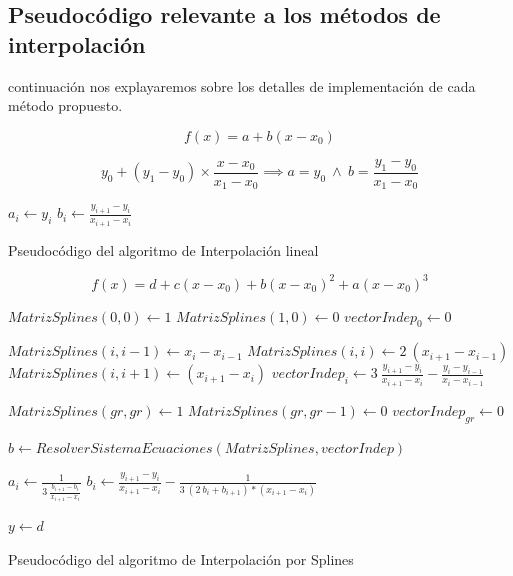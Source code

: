 
\subsection{Pseudocódigo relevante a los métodos de interpolación}
\par {} continuaci\'on nos explayaremos sobre los detalles de
implementaci\'on de cada m\'etodo propuesto.

\vspace{0.4cm}

$$f(x) = a + b (x - x_0)$$

$$y_0 + (y_1-y_0) \times \frac{x - x_0}{x_1 - x_0} \implies a = y_0 \ \wedge \ b = \frac{y_1-y_0}{x_1-x_0}$$

\begin{algorithm}
    
    {		
		$a_i \gets y_i$\;
		$b_i \gets \frac{y_{i+1} - y_{i} }{x_{i+1} - x_{i}}$\;
	}
    \caption{Pseudoc\'odigo del algoritmo de Interpolaci\'on lineal}
    \label{alg:int_lineal}
\end{algorithm}

$$f(x) = d + c ( x - x_0 ) + b ( x - x_0)^2 + a ( x - x_0)^3$$

\begin{algorithm}
    
	$MatrizSplines(0,0) \gets  1$\;
	$MatrizSplines(1,0) \gets  0$\;
	$vectorIndep_0 \gets 0$\;    
    
    {		
		$MatrizSplines(i,i-1) \gets x_i - x_{i-1}$\;
		$MatrizSplines(i,i) \gets 2 \ (x_{i+1} - x_{i-1})$\;
		$MatrizSplines(i,i+1) \gets (x_{i+1} - x_i)$\;
		$vectorIndep_i \gets 3 \  \frac{y_{i+1} - y_i }{x_{i+1}- x_{i}} - \frac{y_i - y_{i-1}}{ x_i -x_{i-1}}$\;
	}    
	
	$MatrizSplines(gr,gr) \gets  1$\;
	$MatrizSplines(gr,gr-1) \gets  0$\;
	$vectorIndep_{gr} \gets 0$\; 
	
	$b \gets ResolverSistemaEcuaciones(MatrizSplines,vectorIndep)$\;
	
	{
		$a_i \gets \frac{1}{3 \ \frac{b_{i+1} - b_{i}}{x_{i+1} - x_i}}$\;
		$b_i \gets \frac{y_{i+1}- y_i}{x_{i+1}- x_i} - \frac{1}{3 \ (2 \ b_i + b_{i+1}) * (x_{i+1} - x_{i})}$\;
	}    
	
	$y \gets d$	
	
    \caption{Pseudoc\'odigo del algoritmo de Interpolaci\'on por Splines}
    \label{alg:int_splines}
\end{algorithm}


